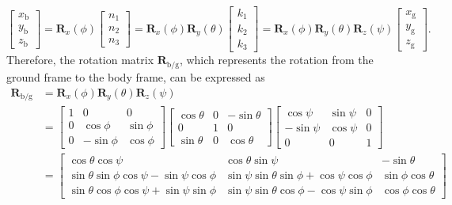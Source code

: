 \begin{equation}
\left[\begin{array}{l}
{x_{\text{b}}}\\
{y_{\text{b}}}\\
{z_{\text{b}}}
\end{array}\right]={\mathbf{R}_{x}}\left(\phi\right)\left[{\begin{array}{c}
	{n_{1}}\\
	{n_{2}}\\
	{n_{3}}
	\end{array}}\right]={\mathbf{R}_{x}}\left(\phi\right){\mathbf{R}_{y}}\left(\theta\right)\left[\begin{array}{l}
{k_{1}}\\
{k_{2}}\\
{k_{3}}
\end{array}\right]={\mathbf{R}_{x}}\left(\phi\right){\mathbf{R}_{y}}\left(\theta\right){\mathbf{R}_{z}}\left(\psi\right)\left[{\begin{array}{c}
	{x_{\text{g}}}\\
	{y_{\text{g}}}\\
	{z_{\text{g}}}
	\end{array}}\right].\label{eq:2.12}
\end{equation}
Therefore, the rotation matrix ${{\mathbf{R}}_{\text{{b}/{g}}}}$,
which represents the rotation from the ground frame to the body frame,
can be expressed as
\begin{equation}
\begin{aligned}
{{\mathbf{R}}_{\text{{b}/{g}}}}&={{\mathbf{R}}_{x}}\left(\phi\right){{\mathbf{R}}_{y}}\left(\theta\right){{\mathbf{R}}_{z}}\left(\psi\right)\\
&=\left[\begin{array}{ccc}
1 & 0 & 0\\
0 & \cos\phi & \sin\phi\\
0 & -\sin\phi & \cos\phi
\end{array}\right]\left[\begin{array}{ccc}
\cos\theta & 0 & -\sin\theta\\
0 & 1 & 0\\
\sin\theta & 0 & \cos\theta
\end{array}\right]\left[\begin{array}{ccc}
\cos\psi & \sin\psi & 0\\
-\sin\psi & \cos\psi & 0\\
0 & 0 & 1
\end{array}\right]\\
&=\left[\begin{array}{ccc}
\cos\theta\cos\psi & \cos\theta\sin\psi & -\sin\theta\\
\sin\theta\sin\phi\cos\psi-\sin\psi\cos\phi & \sin\psi\sin\theta\sin\phi+\cos\psi\cos\phi & \sin\phi\cos\theta\\
\sin\theta\cos\phi\cos\psi+\sin\psi\sin\phi & \sin\psi\sin\theta\cos\phi-\cos\psi\sin\phi & \cos\phi\cos\theta
\end{array}\right]
\end{aligned}\label{2.13}
\end{equation}
